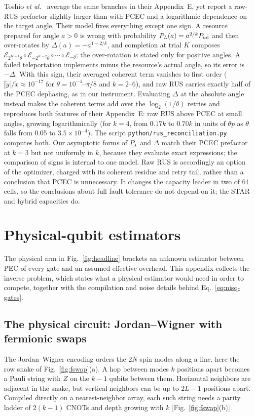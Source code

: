 \documentclass[11pt]{article}
\begin{document}
Toshio \textit{et al.}~\cite{toshio} average the same branches in their
Appendix~E, yet report a raw-RUS prefactor slightly larger than with PCEC and
a logarithmic dependence on the target angle. Their model fixes everything
except one sign. A resource prepared for angle $a>0$ is wrong with probability
$P_L(a)=a^{2/k}P_{\rm ud}$ and then over-rotates by $\Delta(a)=-a^{1-2/k}$, and
completion at trial $K$ composes $\mathcal{E}_{2^{K-1}\theta}\circ
\mathcal{E}_{-2^{K-2}\theta}\circ\cdots\circ\mathcal{E}_{-\theta}$; the over-rotation is
stated only for positive angles. A failed teleportation implements minus the
resource's actual angle, so its error is $-\Delta$. With this sign, their averaged
coherent term vanishes to first order ($|\tilde y|/\tilde x\approx10^{-17}$ for
$\theta=10^{-4}$--$\pi/8$ and $k=2$--6), and raw RUS carries exactly half of the
PCEC dephasing, as in our instrument. Evaluating $\Delta$ at the absolute angle
instead makes the coherent terms add over the $\log_2(1/\theta)$ retries and
reproduces both features of their Appendix~E: raw RUS above PCEC at small angles,
growing logarithmically (for $k=4$, from $0.17k$ to $0.70k$ in units of $\theta p$
as $\theta$ falls from 0.05 to $3.5\times10^{-4}$). The script
\texttt{python/rus\_reconciliation.py} computes both. Our asymptotic forms of
$P_L$ and $\Delta$ match their PCEC prefactor at $k=3$ but not uniformly in $k$,
because they evaluate exact expressions; the comparison of signs is internal to
one model. Raw RUS is accordingly an option of the optimizer, charged
with its coherent residue and retry tail, rather than a conclusion that PCEC
is unnecessary. It changes the capacity leader in two of 64 cells, so the
conclusions about full fault tolerance do not depend on it; the STAR and
hybrid capacities do.


\section{Physical-qubit estimators}\label{app:nisq}
The physical arm in Fig.~\ref{fig:headline} brackets an unknown estimator
between PEC of every gate and an assumed effective overhead. This appendix
collects the inverse problem, which states what a physical estimator would
need in order to compete, together with the compilation and noise details
behind Eq.~\eqref{eq:nisq-gates}.
\subsection{The physical circuit: Jordan--Wigner with fermionic swaps}\label{sec:fswap}
The Jordan--Wigner encoding orders the $2N$ spin modes along a line, here the
row snake of Fig.~\ref{fig:fswap}(a). A hop between modes $k$ positions apart
becomes a Pauli string with $Z$ on the $k-1$ qubits between them. Horizontal
neighbors are adjacent in the snake, but vertical neighbors can be up to $2L-1$
positions apart. Compiled directly on a nearest-neighbor array, each such string
needs a parity ladder of $2(k-1)$ CNOTs and depth growing with $k$
[Fig.~\ref{fig:fswap}(b)].
\end{document}
